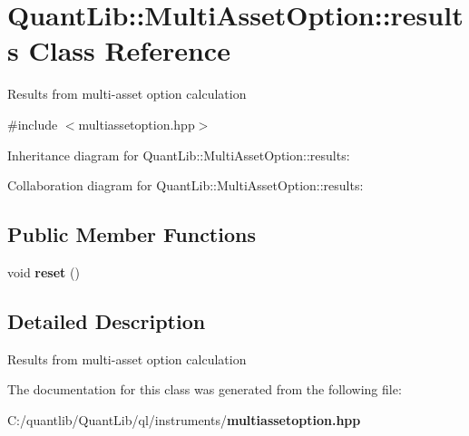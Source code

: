 \section{Quant\+Lib\+:\+:Multi\+Asset\+Option\+:\+:results Class Reference}
\label{class_quant_lib_1_1_multi_asset_option_1_1results}


Results from multi-\/asset option calculation  




{\ttfamily \#include $<$multiassetoption.\+hpp$>$}



Inheritance diagram for Quant\+Lib\+:\+:Multi\+Asset\+Option\+:\+:results\+:


Collaboration diagram for Quant\+Lib\+:\+:Multi\+Asset\+Option\+:\+:results\+:
\subsection*{Public Member Functions}
\begin{DoxyCompactItemize}
\item 
void {\bfseries reset} ()\label{class_quant_lib_1_1_multi_asset_option_1_1results_a2dde5e2bc0327f4ed9166402fb78c187}

\end{DoxyCompactItemize}


\subsection{Detailed Description}
Results from multi-\/asset option calculation 

The documentation for this class was generated from the following file\+:\begin{DoxyCompactItemize}
\item 
C\+:/quantlib/\+Quant\+Lib/ql/instruments/{\bf multiassetoption.\+hpp}\end{DoxyCompactItemize}
